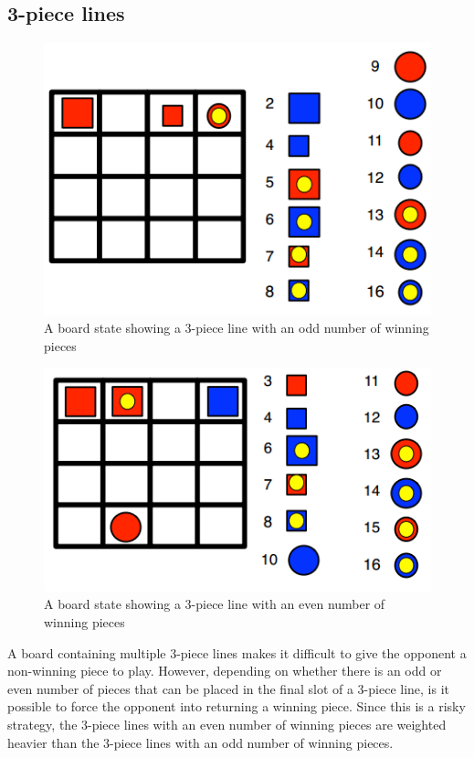 \subsection{3-piece lines}
\begin{figure}[htb]
\label{fig: 3-odd}
\includegraphics{pictures/3-odd.png}
\caption[A 3-piece line in \quarto{}]{A board state showing a 3-piece line with 
an odd number of winning pieces}
\end{figure}
\begin{figure}[htb]
\label{fig: 3-even}
\includegraphics{pictures/3-even.png}
\caption[A 3-piece line in \quarto{}]{A board state showing a 3-piece line with 
an even number of winning pieces}
\end{figure}
A board containing multiple 3-piece lines makes it difficult to give the 
opponent a non-winning piece to play. However, depending on whether there is 
an odd or even number of pieces that can be placed in the final slot of a 
3-piece line, is it possible to force the opponent into returning a winning 
piece. Since this is a risky strategy, the 3-piece lines with an even number 
of winning pieces are weighted heavier than the 3-piece lines with an odd 
number of winning pieces.

